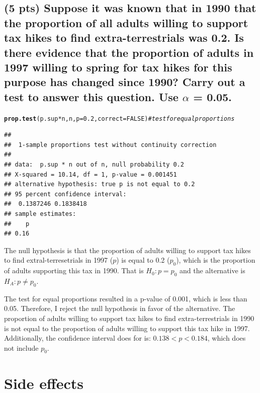 \documentclass{article}\usepackage[]{graphicx}\usepackage[]{color}
\makeatletter
\newcommand{\hlnum}[1]{\textcolor[rgb]{0.686,0.059,0.569}{#1}}%
\newcommand{\hlcom}[1]{\textcolor[rgb]{0.678,0.584,0.686}{\textit{#1}}}%
\newcommand{\hlopt}[1]{\textcolor[rgb]{0,0,0}{#1}}%
\newcommand{\hlstd}[1]{\textcolor[rgb]{0.345,0.345,0.345}{#1}}%
\newcommand{\hlkwc}[1]{\textcolor[rgb]{0.333,0.667,0.333}{#1}}%
\newcommand{\hlkwd}[1]{\textcolor[rgb]{0.737,0.353,0.396}{\textbf{#1}}}%
\newenvironment{kframe}{%
 \def\at@end@of@kframe{}%
 \ifinner\ifhmode%
  \def\at@end@of@kframe{\end{minipage}}%
  \begin{minipage}{\columnwidth}%
 \fi\fi%
 \def\FrameCommand##1{\hskip\@totalleftmargin \hskip-\fboxsep
 \colorbox{shadecolor}{##1}\hskip-\fboxsep
     \hskip-\linewidth \hskip-\@totalleftmargin \hskip\columnwidth}%
 \MakeFramed {\advance\hsize-\width
   \@totalleftmargin\z@ \linewidth\hsize
   \@setminipage}}%
 {\par\unskip\endMakeFramed%
 \at@end@of@kframe}
\newenvironment{knitrout}{}{} %
\makeatother
\begin{document}
\subsection{(5 pts) Suppose it was known that in 1990 that the proportion of all adults willing to support tax hikes to find extra-terrestrials was 0.2. Is there evidence that the proportion of adults in 1997 willing to spring for tax hikes for this purpose has changed since 1990? Carry out a test to answer this
question. Use $\alpha$ = 0.05.}

\begin{knitrout}
\color{fgcolor}\begin{kframe}
\begin{alltt}
\hlkwd{prop.test}\hlstd{(p.sup} \hlopt{*} \hlstd{n, n,} \hlkwc{p} \hlstd{=} \hlnum{0.2}\hlstd{,} \hlkwc{correct} \hlstd{=} \hlnum{FALSE}\hlstd{)} \hlcom{# test for equal proportions}
\end{alltt}
\begin{verbatim}
## 
## 	1-sample proportions test without continuity correction
## 
## data:  p.sup * n out of n, null probability 0.2
## X-squared = 10.14, df = 1, p-value = 0.001451
## alternative hypothesis: true p is not equal to 0.2
## 95 percent confidence interval:
##  0.1387246 0.1838418
## sample estimates:
##    p 
## 0.16
\end{verbatim}
\end{kframe}
\end{knitrout}

The null hypothesis is that the proportion of adults willing to support tax hikes to find extral-terresetrials in 1997 ($p$) is equal to 0.2 ($p_0$), which is the proportion of adults supporting this tax in 1990.  That is $H_0: p = p_0$ and the alternative is $H_A : p \ne p_0$.

The test for equal proportions resulted in a p-value of 0.001, which is less than 0.05.  Therefore, I reject the null hypothesis in favor of the alternative.  The proportion of adults willing to support tax hikes to find extra-terrestrials in 1990 is not equal to the proportion of adults willing to support this tax hike in 1997.  Additionally, the confidence interval does for  is: $ 0.138 < p < 0.184$, which does not include $p_0$.

\section{Side effects}
\end{document}
